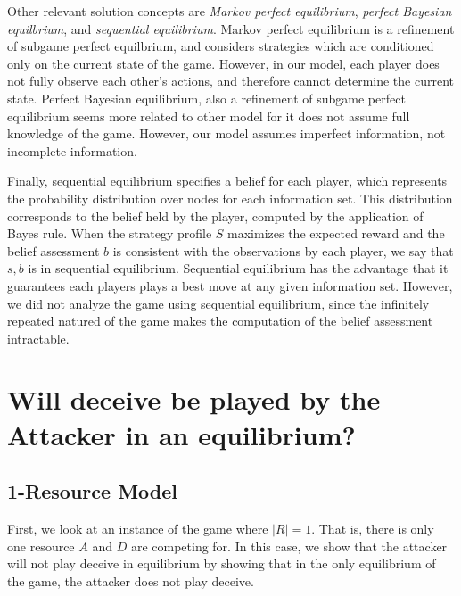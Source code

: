 \documentclass[11pt]{article}
\theoremstyle{plain}
\begin{document}
Other relevant solution concepts are \textit{Markov perfect equilibrium}, \textit{perfect Bayesian equilbrium}, and \textit{sequential equilibrium}. {Markov perfect equilibrium} is a refinement of {subgame perfect equilbrium}, and considers strategies which are conditioned only on the current state of the game. However, in our model, each player does not fully observe each other's actions, and therefore cannot determine the current state.  {Perfect Bayesian equilibrium}, also a refinement of {subgame perfect equilibrium} seems more related to other model for it does not assume full knowledge of the game. However, our model assumes {imperfect information}, not {incomplete information}. 


Finally, sequential equilibrium specifies a belief for each player, which represents the probability distribution over nodes for each information set. This distribution corresponds to the belief held by the player, computed by the application of Bayes rule. When the strategy profile $S$ maximizes the expected reward and the belief assessment $b$ is consistent with the observations by each player, we say that  $s,b$ is in sequential equilibrium. Sequential equilibrium has the advantage that it guarantees each players plays a best move at any given information set. However, we did not analyze the game using sequential equilibrium, since the infinitely repeated natured of the game makes the computation of the belief assessment intractable. %

    

\section{Will deceive be played by the Attacker in an equilibrium?}
\subsection{1-Resource Model}
First, we look at an instance of the game where $|R|=1$. That is, there is only one resource $A$ and $D$ are competing for. 
In this case, we show that the attacker will not play deceive in equilibrium by showing that in the only equilibrium of the game, the attacker does not play deceive.
	
\end{document}
